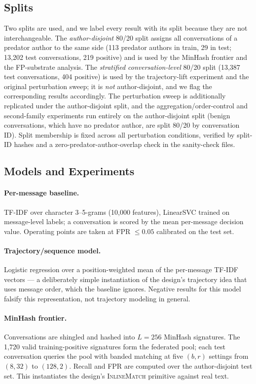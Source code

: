 \documentclass[11pt]{article}
\begin{document}
\subsection{Splits}
Two splits are used, and we label every result with its split because they are not interchangeable. The \emph{author-disjoint} 80/20 split assigns all conversations of a predator author to the same side (113 predator authors in train, 29 in test; 13{,}202 test conversations, 219 positive) and is used by the MinHash frontier and the FP-substrate analysis. The \emph{stratified conversation-level} 80/20 split (13{,}387 test conversations, 404 positive) is used by the trajectory-lift experiment and the original perturbation sweep; it is \emph{not} author-disjoint, and we flag the corresponding results accordingly. The perturbation sweep is additionally replicated under the author-disjoint split, and the aggregation/order-control and second-family experiments run entirely on the author-disjoint split (benign conversations, which have no predator author, are split 80/20 by conversation ID). Split membership is fixed across all perturbation conditions, verified by split-ID hashes and a zero-predator-author-overlap check in the sanity-check files.

\subsection{Models and Experiments}

\paragraph{Per-message baseline.}
TF-IDF over character 3--5-grams (10{,}000 features), LinearSVC trained on message-level labels; a conversation is scored by the mean per-message decision value. Operating points are taken at FPR $\leq 0.05$ calibrated on the test set.

\paragraph{Trajectory/sequence model.}
Logistic regression over a position-weighted mean of the per-message TF-IDF vectors --- a deliberately simple instantiation of the design's trajectory idea that uses message order, which the baseline ignores. Negative results for this model falsify this representation, not trajectory modeling in general.

\paragraph{MinHash frontier.}
Conversations are shingled and hashed into $L = 256$ MinHash signatures. The 1{,}720 valid training-positive signatures form the federated pool; each test conversation queries the pool with banded matching at five $(b, r)$ settings from $(8,32)$ to $(128,2)$. Recall and FPR are computed over the author-disjoint test set. This instantiates the design's \textsc{InlineMatch} primitive against real text.
\end{document}
